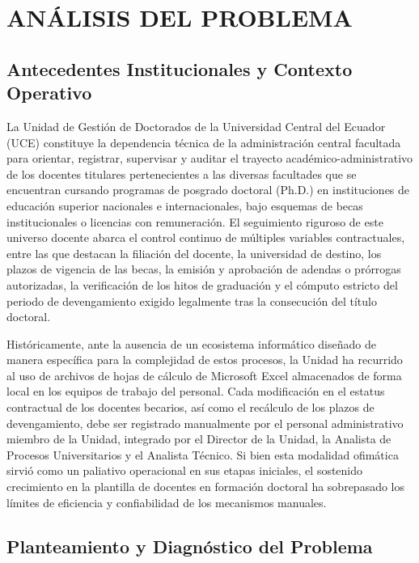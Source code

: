 
\section{ANÁLISIS DEL PROBLEMA}

\subsection{Antecedentes Institucionales y Contexto Operativo}

La Unidad de Gestión de Doctorados de la Universidad Central del Ecuador (UCE) constituye la dependencia técnica de la administración central facultada para orientar, registrar, supervisar y auditar el trayecto académico-administrativo de los docentes titulares pertenecientes a las diversas facultades que se encuentran cursando programas de posgrado doctoral (Ph.D.) en instituciones de educación superior nacionales e internacionales, bajo esquemas de becas institucionales o licencias con remuneración. El seguimiento riguroso de este universo docente abarca el control continuo de múltiples variables contractuales, entre las que destacan la filiación del docente, la universidad de destino, los plazos de vigencia de las becas, la emisión y aprobación de adendas o prórrogas autorizadas, la verificación de los hitos de graduación y el cómputo estricto del periodo de devengamiento exigido legalmente tras la consecución del título doctoral.

Históricamente, ante la ausencia de un ecosistema informático diseñado de manera específica para la complejidad de estos procesos, la Unidad ha recurrido al uso de archivos de hojas de cálculo de Microsoft Excel almacenados de forma local en los equipos de trabajo del personal. Cada modificación en el estatus contractual de los docentes becarios, así como el recálculo de los plazos de devengamiento, debe ser registrado manualmente por el personal administrativo miembro de la Unidad, integrado por el Director de la Unidad, la Analista de Procesos Universitarios y el Analista Técnico. Si bien esta modalidad ofimática sirvió como un paliativo operacional en sus etapas iniciales, el sostenido crecimiento en la plantilla de docentes en formación doctoral ha sobrepasado los límites de eficiencia y confiabilidad de los mecanismos manuales.

\subsection{Planteamiento y Diagnóstico del Problema}

